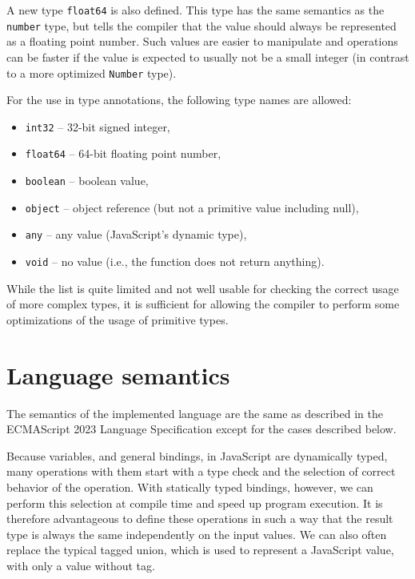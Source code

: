 A new type \texttt{float64} is also defined. This type has the same semantics as the \texttt{number} type, but tells the compiler that the value should always be represented as a floating point number. Such values are easier to manipulate and operations can be faster if the value is expected to usually not be a small integer (in contrast to a more optimized \texttt{Number} type).

For the use in type annotations, the following type names are allowed:
\begin{itemize}
    \item \texttt{int32} -- 32-bit signed integer,
    \item \texttt{float64} -- 64-bit floating point number,
    \item \texttt{boolean} -- boolean value,
    \item \texttt{object} -- object reference (but not a primitive value including null),
    \item \texttt{any} -- any value (JavaScript's dynamic type),
    \item \texttt{void} -- no value (i.e., the function does not return anything).
\end{itemize}

While the list is quite limited and not well usable for checking the correct usage of more complex types, it is sufficient for allowing the compiler to perform some optimizations of the usage of primitive types.



\section{Language semantics}\label{lang:semantics}

The semantics of the implemented language are the same as described in the ECMAScript 2023 Language Specification\cite{ecma262} except for the cases described below.

Because variables, and general bindings, in JavaScript are dynamically typed, many operations with them start with a type check and the selection of correct behavior of the operation. With statically typed bindings, however, we can perform this selection at compile time and speed up program execution. It is therefore advantageous to define these operations in such a way that the result type is always the same independently on the input values. We can also often replace the typical tagged union, which is used to represent a JavaScript value, with only a value without tag.

